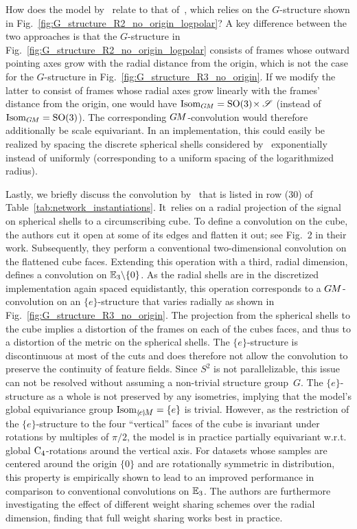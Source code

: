 How does the model by~\citet{ramasinghe2019representation} relate to that of~\citet{esteves2017polar}, which relies on the $G$-structure shown in Fig.~\ref{fig:G_structure_R2_no_origin_logpolar}?
A key difference between the two approaches is that the $G$-structure in Fig.~\ref{fig:G_structure_R2_no_origin_logpolar} consists of frames whose outward pointing axes grow with the radial distance from the origin, which is not the case for the $G$-structure in Fig.~\ref{fig:G_structure_R3_no_origin}.
If we modify the latter to consist of frames whose radial axes grow linearly with the frames' distance from the origin, one would have $\operatorname{Isom}_{G\mkern-1.4muM} = \operatorname{SO}(3) \!\times \mathscr{S}$ (instead of $\operatorname{Isom}_{G\mkern-1.4muM} = \operatorname{SO}(3)$).
The corresponding $G\mkern-1.4muM$-convolution would therefore additionally be scale equivariant.
In an implementation, this could easily be realized by spacing the discrete spherical shells considered by~\citet{ramasinghe2019representation} exponentially instead of uniformly (corresponding to a uniform spacing of the logarithmized radius).


Lastly, we briefly discuss the convolution by~\citet{boomsma2017spherical} that is listed in row (30) of Table~\ref{tab:network_instantiations}.
It~relies on a radial projection of the signal on spherical shells to a circumscribing cube.
To define a convolution on the cube, the authors cut it open at some of its edges and flatten it out; see Fig.~2 in their work.
Subsequently, they perform a conventional two-dimensional convolution on the flattened cube faces.
Extending this operation with a third, radial dimension, defines a convolution on $\mathbb{E}_3 \backslash \{0\}$.
As the radial shells are in the discretized implementation again spaced equidistantly, this operation corresponds to a $G\mkern-1.4muM$-convolution on an $\{e\}$-structure that varies radially as shown in Fig.~\ref{fig:G_structure_R3_no_origin}.
The projection from the spherical shells to the cube implies a distortion of the frames on each of the cubes faces, and thus to a distortion of the metric on the spherical shells.
The $\{e\}$-structure is discontinuous at most of the cuts and does therefore not allow the convolution to preserve the continuity of feature fields.
Since $S^2$ is not parallelizable, this issue can not be resolved without assuming a non-trivial structure group~$G$.
The $\{e\}$-structure as a whole is not preserved by any isometries, implying that the model's global equivariance group $\IsomeM = \{e\}$ is trivial.
However, as the restriction of the $\{e\}$-structure to the four ``vertical'' faces of the cube is invariant under rotations by multiples of $\pi/2$, the model is in practice partially equivariant w.r.t. global $\operatorname{C}_{4}$-rotations around the vertical axis.
For datasets whose samples are centered around the origin $\{0\}$ and are rotationally symmetric in distribution, this property is empirically shown to lead to an improved performance in comparison to conventional convolutions on $\mathbb{E}_3$.
The authors are furthermore investigating the effect of different weight sharing schemes over the radial dimension, finding that full weight sharing works best in practice. 
